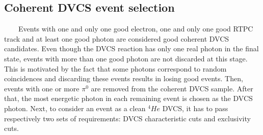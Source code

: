 \subsection{Coherent DVCS event selection}
~~~~Events with one and only one good electron, one and only one good RTPC 
track and at least one good photon are considered good coherent DVCS 
candidates. Even though the DVCS reaction has only one real photon in the final 
state, events with more than one good photon are not discarded at this stage.  
This is motivated by the fact that some photons correspond to random 
coincidences and discarding these events results in losing good events. Then, 
events with one or more $\pi^{0}$ are removed from the coherent DVCS sample.  
After that, the most energetic photon in each remaining event is chosen as the 
DVCS photon. Next, to consider an event as a clean $^{4}He$ DVCS, it has to 
pass respectively two sets of requirements: DVCS characteristic cuts and 
exclusivity cuts.

~\newpage
